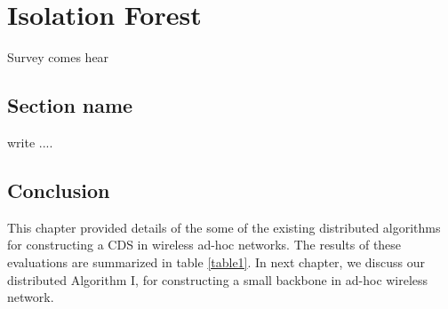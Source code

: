 \chapter{Isolation Forest}
\label{ch:isolation-forest}

Survey comes hear

\section{Section name}

write ....

\section{Conclusion}

This chapter provided details of the some of the existing
distributed algorithms for constructing a CDS in wireless ad-hoc
networks. The results of these evaluations are summarized in table
\ref{table1}. In next chapter, we discuss our distributed
Algorithm I, for constructing a small backbone in ad-hoc wireless
network.

